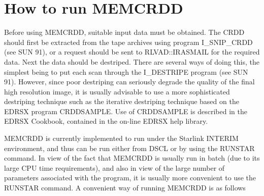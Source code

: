 \section {How to run MEMCRDD}
\label {SEC:RUN}
Before using MEMCRDD, suitable input data must be obtained. The
CRDD should
first be extracted from the tape archives using program I\_SNIP\_CRDD (see SUN
91), or a request should be sent to RLVAD::IRASMAIL for the required
data.
Next the data should be destriped. There are several ways of doing this, the
simplest being to put each scan through the I\_DESTRIPE program (see SUN 91).
However, since poor destriping can seriously degrade the quality of the final
high resolution image, it is usually advisable to use a more sophisticated
destriping technique such as the iterative destriping technique based on the
EDRSX program CRDDSAMPLE. Use of CRDDSAMPLE is described in the EDRSX Cookbook,
contained in the on-line EDRSX help library.

MEMCRDD is currently implemented to run under the Starlink INTERIM environment,
and thus can be run either from DSCL or by using the RUNSTAR command. In view
of the fact that MEMCRDD is usually run in batch (due to its large CPU time
requirements), and also in view of the large number of parameters associated
with the program, it is usually more convenient to use the RUNSTAR command. A
convenient way of running MEMCRDD is as follows

